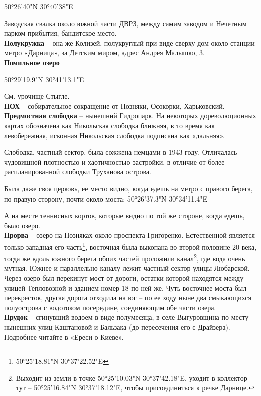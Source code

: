 50°26'40"N 30°40'38"E

Заводская свалка около южной части ДВРЗ, между самим заводом и Нечетным парком прибытия, бандитское место.\\

\textbf{Полукружка} – она же Колизей, полукруглый при виде сверху дом около станции метро «Дарница», за Детским миром, адрес Андрея Малышко, 3.\\

\textbf{Помильное озеро}

50°29'19.9"N 30°41'13.1"E

См. урочище Стыгле.\\

\textbf{ПОХ} – собирательное сокращение от Позняки, Осокорки, Харьковский.\\

\textbf{Предмостная слободка} – нынешний Гидропарк. На некоторых дореволюционных картах обозначена как Никольская слободка ближняя, в то время как левобережная, исконная Никольская слободка подписана как «дальняя».

Слободка, частный сектор, была сожжена немцами в 1943 году. Отличалась чудовищной плотностью и хаотичностью застройки, в отличие от более распланированной слободки Труханова острова. 

Была даже своя церковь, ее место видно, когда едешь на метро с правого берега, по правую сторону, почти около моста: 50°26'37.3"N 30°34'11.4"E

А на месте теннисных кортов, которые видно по той же стороне, когда едешь, было озеро.\\


\textbf{Прорва} – озеро на Позняках около проспекта Григоренко. Естественной является только западная его часть\footnote{50°25'18.81"N 30°37'22.52"E}, восточная была выкопана во второй половине 20 века, тогда же вдоль южного берега обоих частей проложили канал\footnote{Выходит из земли в точке 50°25'10.03"N 30°37'42.18"E, уходит в коллектор тут – 50°25'16.84"N 30°37'18.12"E, чтобы присоединиться к речке Дарнице.}, где вода очень мутная. Южнее и параллельно каналу лежит частный сектор улицы Любарской. Через озеро был перекинут мост от дороги, остатки которой находятся между улицей Тепловозной и зданием номер 18 по ней же. Чуть восточнее моста был перекресток, другая дорога отходила на юг – по ее ходу ныне два смыкающихся полуострова с водотоком посередине, соединяющим обе части озера.\\

\textbf{Прудок} – сгинувший водоем в виде полумесяца, в селе Выгуровщина по месту нынешних улиц Каштановой и Бальзака (до пересечения его с Драйзера). Подробнее читайте в «Ереси о Киеве».